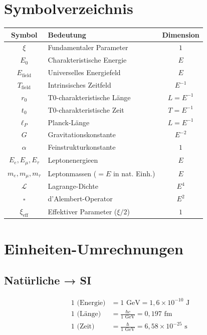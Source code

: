 	\appendix
	
	\section{Symbolverzeichnis}
	
	\begin{longtable}{|c|l|c|}
		\hline
		\textbf{Symbol} & \textbf{Bedeutung} & \textbf{Dimension} \\
		\hline
		$\xi$ & Fundamentaler Parameter & $1$ \\
		$E_0$ & Charakteristische Energie & $E$ \\
		$E_{\text{field}}$ & Universelles Energiefeld & $E$ \\
		$T_{\text{field}}$ & Intrinsisches Zeitfeld & $E^{-1}$ \\
		$r_0$ & T0-charakteristische Länge & $L = E^{-1}$ \\
		$t_0$ & T0-charakteristische Zeit & $T = E^{-1}$ \\
		$\ell_P$ & Planck-Länge & $L = E^{-1}$ \\
		$G$ & Gravitationskonstante & $E^{-2}$ \\
		$\alpha$ & Feinstrukturkonstante & $1$ \\
		$E_e, E_\mu, E_\tau$ & Leptonenergieen & $E$ \\
		$m_e, m_\mu, m_\tau$ & Leptonmassen ($= E$ in nat. Einh.) & $E$ \\
		$\mathcal{L}$ & Lagrange-Dichte & $E^4$ \\
		$\square$ & d'Alembert-Operator & $E^2$ \\
		$\xi_{\text{eff}}$ & Effektiver Parameter ($\xi/2$) & $1$ \\
		\hline
	\end{longtable}
	
	\section{Einheiten-Umrechnungen}
	
	\subsection{Natürliche → SI}
	
	\begin{align}
		1 \text{ (Energie)} &= 1 \text{ GeV} = 1{,}6 \times 10^{-10} \text{ J} \\
		1 \text{ (Länge)} &= \frac{\hbar c}{1 \text{ GeV}} = 0{,}197 \text{ fm} \\
		1 \text{ (Zeit)} &= \frac{\hbar}{1 \text{ GeV}} = 6{,}58 \times 10^{-25} \text{ s}
	\end{align}
	
